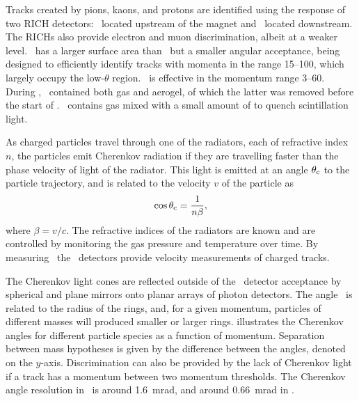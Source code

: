 Tracks created by pions, kaons, and protons are identified using the response 
of two \ac{RICH} detectors: \richone\ located upstream of the magnet and 
\richtwo\ located downstream.
The \acp{RICH} also provide electron and muon discrimination, albeit at a 
weaker level.
\richtwo\ has a larger surface area than \richone\ but a smaller angular 
acceptance, being designed to efficiently identify tracks with momenta in the 
range \SIrange{15}{100}{\GeVc}, which largely occupy the low-$\theta$ region.
\richone\ is effective in the momentum range \SIrange{3}{60}{\GeVc}.
During \runone, \richone\ contained both  gas and aerogel, of which 
the latter was removed before the start of \runtwo.
\richtwo\ contains  gas mixed with a small amount of  to quench 
scintillation light.

As charged particles travel through one of the radiators, each of refractive 
index $n$, the particles emit Cherenkov radiation if they are travelling faster 
than the phase velocity of light of the radiator.
This light is emitted at an angle $\theta_{\textnormal{c}}$ to the particle trajectory, and is 
related to the velocity $v$ of the particle as
\begin{equation}
  \cos{\ensuremath{\theta_{\textnormal{c}}}} = \frac{1}{n\beta},
\end{equation}
where $\beta = v/c$.
The refractive indices of the radiators are known and are controlled by 
monitoring the gas pressure and temperature over time.
By measuring \thetac\ the \rich\ detectors provide velocity measurements of 
charged tracks.

The Cherenkov light cones are reflected outside of the \lhcb\ detector 
acceptance by spherical and plane mirrors onto planar arrays of photon 
detectors.
The angle \thetac\ is related to the radius of the rings, and, for a given 
momentum, particles of different masses will produced smaller or larger rings.
 illustrates the Cherenkov angles for 
different particle species as a function of momentum.
Separation between mass hypotheses is given by the difference between the 
angles, denoted on the $y$-axis.
Discrimination can also be provided by the lack of Cherenkov light if a track 
has a momentum between two momentum thresholds.
The Cherenkov angle resolution in \richone\ is around \SI{1.6}{\milli\radian}, 
and around \SI{0.66}{\milli\radian} in \richtwo.

